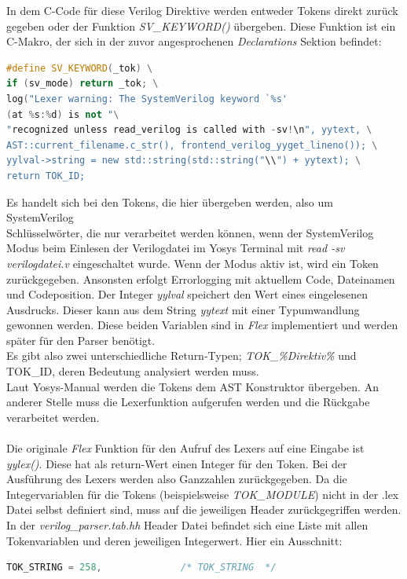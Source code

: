 \documentclass[11pt]{report}
\begin{document}
\begin{itemize}
In dem C-Code für diese Verilog Direktive werden entweder Tokens direkt zurück gegeben oder der Funktion \textit{SV\_KEYWORD()} übergeben. Diese Funktion ist ein C-Makro, der sich in der zuvor angesprochenen \textit{Declarations} Sektion befindet:
\begin{lstlisting}[language=C++]
#define SV_KEYWORD(_tok) \
if (sv_mode) return _tok; \
log("Lexer warning: The SystemVerilog keyword `%s'
(at %s:%d) is not "\
"recognized unless read_verilog is called with -sv!\n", yytext, \
AST::current_filename.c_str(), frontend_verilog_yyget_lineno()); \
yylval->string = new std::string(std::string("\\") + yytext); \
return TOK_ID;
\end{lstlisting}
Es handelt sich bei den Tokens, die hier übergeben werden, also um SystemVerilog \\ Schlüsselwörter, die nur verarbeitet werden können, wenn der SystemVerilog Modus beim Einlesen der Verilogdatei im Yosys Terminal mit \textit{read -sv verilogdatei.v} eingeschaltet wurde. Wenn der Modus aktiv ist, wird ein Token zurückgegeben. Ansonsten erfolgt Errorlogging mit aktuellem Code, Dateinamen und Codeposition. Der Integer \textit{yylval} speichert den Wert eines eingelesenen Ausdrucks. Dieser kann aus dem String \textit{yytext} mit einer Typumwandlung gewonnen werden. Diese beiden Variablen sind in \textit{Flex} implementiert und werden später für den Parser benötigt.\\
Es gibt also zwei unterschiedliche Return-Typen; \textit{TOK\_\%Direktiv\%} und TOK\_ID, deren Bedeutung analysiert werden muss. \\
Laut Yosys-Manual werden die Tokens dem AST Konstruktor übergeben. An anderer Stelle muss die Lexerfunktion aufgerufen werden und die Rückgabe verarbeitet werden.
\\
\\
Die originale \textit{Flex} Funktion für den Aufruf des Lexers auf eine Eingabe ist \textit{yylex()}. Diese hat als return-Wert einen Integer für den Token. Bei der Ausführung des Lexers werden also Ganzzahlen zurückgegeben. Da die Integervariablen für die Tokens (beispielsweise \textit{TOK\_MODULE}) nicht in der .lex Datei selbst definiert sind, muss auf die jeweiligen Header zurückgegriffen werden. In der \textit{verilog\_parser.tab.hh} Header Datei befindet sich eine Liste mit allen Tokenvariablen und deren jeweiligen Integerwert. Hier ein Ausschnitt:
\begin{lstlisting}[language=C++]
    TOK_STRING = 258,              /* TOK_STRING  */

\end{lstlisting}
\end{itemize}
\end{document}
